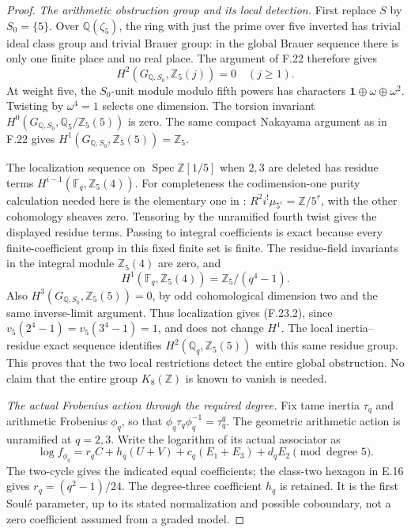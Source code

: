 \begin{proof}
\emph{The arithmetic obstruction group and its local detection.}
First replace \(S\) by \(S_0=\{5\}\). Over
\(\mathbb Q(\zeta_5)\), the ring with just the prime over
five inverted has trivial ideal class group and trivial
Brauer group: in the global Brauer sequence there is only
one finite place and no real place. The argument of F.22
therefore gives
\[
 H^2(G_{\mathbb Q,S_0},\mathbb Z_5(j))=0\quad(j\geq1).
                                                               \tag{F.23.9}
\]
At weight five, the \(S_0\)-unit module modulo fifth powers
has characters \(\mathbf1\oplus\omega\oplus\omega^2\).
Twisting by \(\omega^4=1\) selects one dimension.
The torsion invariant
\(H^0(G_{\mathbb Q,S_0},\mathbb Q_5/\mathbb Z_5(5))\)
is zero. The same compact Nakayama argument as in F.22
gives \(H^1(G_{\mathbb Q,S_0},\mathbb Z_5(5))=\mathbb Z_5\).

The localization sequence on \(\operatorname{Spec}\mathbb Z[1/5]\)
when \(2,3\) are deleted has residue terms
\(H^{i-1}(\mathbb F_q,\mathbb Z_5(4))\).
For completeness the codimension-one purity calculation
needed here is the elementary one in
\citet[II, \S0.1(f), Corollary~1.6 and Remark~1.7(b)]{FA_Milne2006ADT}:
\(R^2i^!\mu_{5^r}=\mathbb Z/5^r\), with the other
cohomology sheaves zero. Tensoring by the unramified
fourth twist gives the displayed residue terms.
Passing to integral coefficients is exact because every
finite-coefficient group in this fixed finite set is finite.
The residue-field invariants in the integral module
\(\mathbb Z_5(4)\) are zero, and
\[
 H^1(\mathbb F_q,\mathbb Z_5(4))
           =\mathbb Z_5/(q^4-1).
\]
Also \(H^3(G_{\mathbb Q,S_0},\mathbb Z_5(5))=0\), by odd
cohomological dimension two and the same inverse-limit
argument. Thus localization gives (F.23.2), since
\(v_5(2^4-1)=v_5(3^4-1)=1\), and does not change \(H^1\).
The local inertia--residue exact sequence identifies
\(H^2(\mathbb Q_q,\mathbb Z_5(5))\) with this same residue
group. This proves that the two local restrictions detect
the entire global obstruction. No claim that the entire
group \(K_8(\mathbb Z)\) is known to vanish is needed.

\emph{The actual Frobenius action through the required degree.}
Fix tame inertia \(\tau_q\) and arithmetic Frobenius
\(\phi_q\), so that
\(\phi_q\tau_q\phi_q^{-1}=\tau_q^q\).
The geometric arithmetic action is unramified at \(q=2,3\).
Write the logarithm of its actual associator as
\[
 \log f_{\phi_q}
 =r_qC+h_q(U+V)+c_q(E_1+E_3)+d_qE_2
                                      \pmod{\text{degree }5}.
                                                               \tag{F.23.10}
\]
The two-cycle gives the indicated equal coefficients;
the class-two hexagon in E.16 gives
\(r_q=(q^2-1)/24\).
The degree-three coefficient \(h_q\) is retained. It is
the first Soulé parameter, up to its stated normalization
and possible coboundary, not a zero coefficient assumed
from a graded model.


\end{proof}

